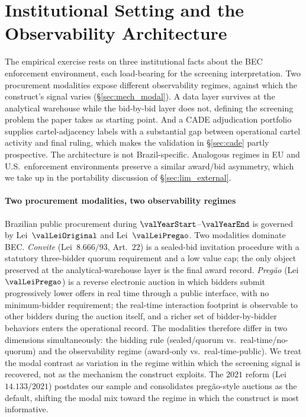 \section{Institutional Setting and the Observability Architecture}
\label{sec:institutional}

The empirical exercise rests on three institutional facts about
the BEC enforcement environment, each load-bearing for the
screening interpretation. Two procurement modalities expose
different observability regimes, against which the construct's
signal varies (\S\ref{sec:mech_modal}). A data layer survives at
the analytical warehouse while the bid-by-bid layer does not,
defining the screening problem the paper takes as starting
point. And a CADE adjudication portfolio supplies cartel-adjacency
labels with a substantial gap between operational cartel activity
and final ruling, which makes the validation in \S\ref{sec:cade}
partly prospective. The architecture is not Brazil-specific.
Analogous regimes in EU and U.S.\ enforcement environments
preserve a similar award/bid asymmetry, which we take up in the
portability discussion of \S\ref{sec:lim_external}.

\paragraph{Two procurement modalities, two observability regimes}
Brazilian public procurement during $\valYearStart$--$\valYearEnd$
is governed by Lei~$\valLeiOriginal$ and Lei~$\valLeiPregao$.
Two modalities dominate BEC.
\emph{Convite} (Lei~$8.666/93$, Art.~$22$) is a sealed-bid
invitation procedure with a statutory three-bidder quorum
requirement and a low value cap; the only object preserved at
the analytical-warehouse layer is the final award record.
\emph{Preg\~ao} (Lei~$\valLeiPregao$) is a reverse electronic
auction in which bidders submit progressively lower offers in
real time through a public interface, with no minimum-bidder
requirement; the real-time interaction footprint is observable
to other bidders during the auction itself, and a richer set of
bidder-by-bidder behaviors enters the operational record. The
modalities therefore differ in two dimensions simultaneously: the
bidding rule (sealed/quorum vs.~real-time/no-quorum) and the
observability regime (award-only vs.~real-time-public). We treat
the modal contrast as variation in the regime within which the
screening signal is recovered, not as the mechanism the construct
exploits. The $2021$ reform (Lei~$14.133/2021$) postdates our
sample and consolidates preg\~ao-style auctions as the default,
shifting the modal mix toward the regime in which the construct
is most informative.

